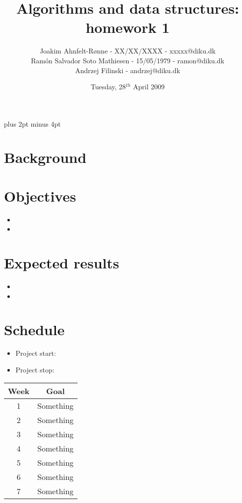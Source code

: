 \documentclass[a4paper,12pt]{article}
\title{Algorithms and data structures: homework 1}
\author{Joakim Ahnfelt-Rønne - XX/XX/XXXX - xxxxx@diku.dk\\
        Ramón Salvador Soto Mathiesen - 15/05/1979 - ramon@diku.dk\\
        Andrzej Filinski - andrzej@diku.dk}
\date{Tuesday, 28$^{th}$ April 2009}
\begin{document}
\parindent=0pt
\parskip=8pt plus 2pt minus 4pt

\maketitle
\newpage

\section*{Background}
%

\section*{Objectives}
\begin{itemize}
 \item
 \item
\end{itemize}
 
\section*{Expected results}
\begin{itemize}
 \item
 \item
\end{itemize}

\newpage
\section*{Schedule}
\begin{itemize}
 \item Project start:
 \item Project stop: 
\end{itemize}

\begin{tabular}{|c|c|}
    \hline
    Week & Goal\\
    \hline
    1 & Something \\
    \hline
    2 & Something \\
    \hline
    3 & Something \\
    \hline
    4 & Something \\
    \hline
    5 & Something \\
    \hline
    6 & Something \\
    \hline
    7 & Something \\
    \hline
\end{tabular}
\end{document}
